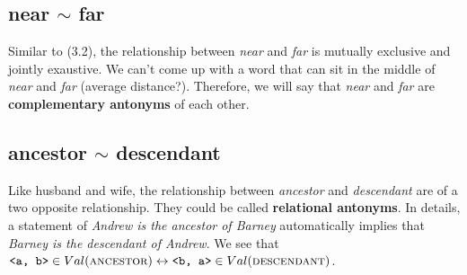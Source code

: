 \documentclass{article}
\begin{document}
\subsection{near $\sim$ far}
Similar to (3.2), the relationship between \textit{near} and \textit{far} is mutually exclusive and jointly exaustive. We can't come up with a word that can sit in the middle of \textit{near} and \textit{far} (average distance?). Therefore, we will say that \textit{near} and \textit{far} are \textbf{complementary antonyms} of each other.

\subsection{ancestor $\sim$ descendant}
Like husband and wife, the relationship between \textit{ancestor} and \textit{descendant} are of a two opposite relationship. They could be called \textbf{relational antonyms}. In details, a statement of \textit{Andrew is the ancestor of Barney} automatically implies that \textit{Barney is the descendant of Andrew}. We see that $\verb|<a, b>| \in Val(\textsc{ancestor}) \leftrightarrow \verb|<b, a>| \in Val(\textsc{descendant})$. 
\end{document}
